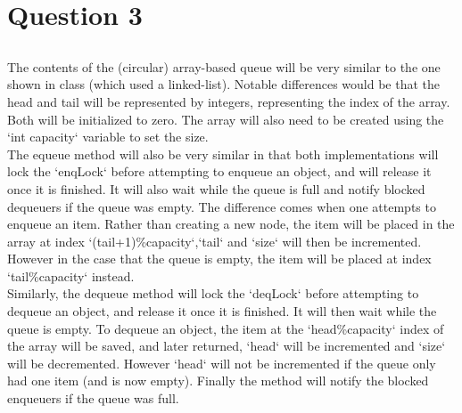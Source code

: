 \documentclass[11pt]{article}
\begin{document}
\section{Question 3}

\subsection{}
The contents of the (circular) array-based queue will be very similar to the one shown in class (which used a linked-list). Notable differences 
would be that the head and tail will be represented by integers, representing the index of the array. Both will be initialized to zero. 
The array will also need to be created using the `int capacity` variable to set the size.\\
The equeue method will also be very similar in that both implementations will lock the `enqLock` before attempting to enqueue an object, 
and will release it once it is finished. It will also wait while the queue is full and notify blocked dequeuers if the queue was empty. 
The difference comes when one attempts to enqueue an item. Rather than creating a new node, the item will be placed in the array at index 
`(tail+1)\%capacity`,`tail` and `size` will then be incremented. However in the case that the queue is empty, the item will be placed at 
index `tail\%capacity` instead.\\
Similarly, the dequeue method will lock the `deqLock` before attempting to dequeue an object, and release it once it is finished. It will 
then wait while the queue is empty. To dequeue an object, the item at the `head\%capacity` index of the array will be saved, and later 
returned, `head` will be incremented and `size` will be decremented.  However `head` will not be incremented if the queue only had one 
item (and is now empty). Finally the method will notify the blocked enqueuers if the queue 
was full.
\end{document}

